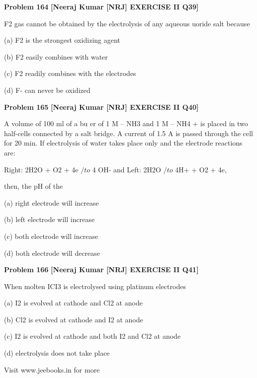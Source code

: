 \begin{problembox}
\textbf{Problem 164} \hfill \textbf{[Neeraj Kumar [NRJ] EXERCISE II Q39]}
\label{q:ext-nrj_all_questions-164}

F2 gas cannot be obtained by the electrolysis of 
any aqueous   uoride salt because
 
 (a) F2 is the strongest oxidizing agent
 
 (b) F2 easily combines with water
 
 (c)  F2 readily combines with the  electrodes
 
 (d) F- can never be oxidized
\end{problembox}

\begin{problembox}
\textbf{Problem 165} \hfill \textbf{[Neeraj Kumar [NRJ] EXERCISE II Q40]}
\label{q:ext-nrj_all_questions-165}

A volume of 100 ml of a bu  er of 1 M -- NH3 and 1 
M -- NH4
+ is placed in two  half-cells connected by 
a salt bridge. A current of 1.5 A is passed through 
the cell for 20 min. If electrolysis of water takes 
place only and the electrode reactions are:
 
      Right: 2H2O + O2 + 4e $/to$ 4 OH- 
and Left: 2H2O $/to$ 4H+ + O2 + 4e,
 
 then, the pH of the
 
 (a) right electrode will increase
 
 (b) left electrode will increase
 
 (c) both electrode will increase
 
 (d) both electrode will decrease
\end{problembox}

\begin{problembox}
\textbf{Problem 166} \hfill \textbf{[Neeraj Kumar [NRJ] EXERCISE II Q41]}
\label{q:ext-nrj_all_questions-166}

When molten ICI3 is electrolysed using platinum 
electrodes
 
 (a)  I2 is evolved at cathode and Cl2 at anode
 
 (b)  Cl2 is evolved at cathode and I2 at anode
 
 (c)  I2 is evolved at cathode and both I2 and Cl2 at 
anode
 
 (d) electrolysis does not take place
  
 
 
Visit www.jeebooks.in for more
\end{problembox}

